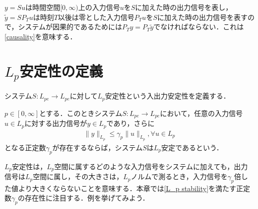 \documentclass[a4paper,11pt,uplatex]{jsarticle} %
\theoremstyle{definition}	%
\begin{document}
$y= S u $は時間空間$[0, \infty)$上の入力信号$u$を$S$に加えた時の出力信号を表し，$\tilde{y} = S P_T u$は時刻$T$以後は零とした入力信号$P_T u $を$S$に加えた時の出力信号を表すので，システムが因果的であるためには$P_T y = P_T \tilde{y}$でなければならない．これは\eqref{causality}を意味する．

\section{$L_p$安定性の定義}
システム$S: L_{pe} \to L_{pe}$に対して$L_p$安定性という入出力安定性を定義する．

\begin{tcolorbox}[title=定義5.2,
drop small lifted shadow=black]
$p \in [0, \infty]$とする．このときシステム$S: L_{pe} \to L_{pe} $において，任意の入力信号$u \in L_p $に対する出力信号が$y \in L_p$であり，さらに
\begin{align}
\label{L_p stability}
\| y \|_{L_p} \leq \gamma_p \| u \|_{L_p} , \forall u \in L_p
\end{align}
となる正定数$\gamma_p$が存在するならば，システム$S$は$L_p$安定であるという．
\end{tcolorbox}
$L_p$安定性は，$L_p$空間に属するどのような入力信号をシステムに加えても，出力信号は$L_p$空間に属し，その大きさは，$L_p$ノルムで測るとき，入力信号を$\gamma_p$倍した値より大きくならないことを意味する．本章では\eqref{L_p stability}を満たす正定数$\gamma_p$の存在性に注目する．例を挙げてみよう．
\end{document}
